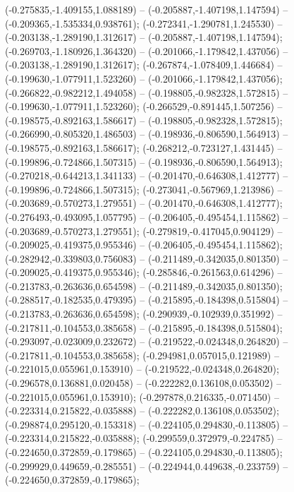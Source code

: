  (-0.275835,-1.409155,1.088189) -- (-0.205887,-1.407198,1.147594) -- (-0.209365,-1.535334,0.938761);
 (-0.272341,-1.290781,1.245530) -- (-0.203138,-1.289190,1.312617) -- (-0.205887,-1.407198,1.147594);
 (-0.269703,-1.180926,1.364320) -- (-0.201066,-1.179842,1.437056) -- (-0.203138,-1.289190,1.312617);
 (-0.267874,-1.078409,1.446684) -- (-0.199630,-1.077911,1.523260) -- (-0.201066,-1.179842,1.437056);
 (-0.266822,-0.982212,1.494058) -- (-0.198805,-0.982328,1.572815) -- (-0.199630,-1.077911,1.523260);
 (-0.266529,-0.891445,1.507256) -- (-0.198575,-0.892163,1.586617) -- (-0.198805,-0.982328,1.572815);
 (-0.266990,-0.805320,1.486503) -- (-0.198936,-0.806590,1.564913) -- (-0.198575,-0.892163,1.586617);
 (-0.268212,-0.723127,1.431445) -- (-0.199896,-0.724866,1.507315) -- (-0.198936,-0.806590,1.564913);
 (-0.270218,-0.644213,1.341133) -- (-0.201470,-0.646308,1.412777) -- (-0.199896,-0.724866,1.507315);
 (-0.273041,-0.567969,1.213986) -- (-0.203689,-0.570273,1.279551) -- (-0.201470,-0.646308,1.412777);
 (-0.276493,-0.493095,1.057795) -- (-0.206405,-0.495454,1.115862) -- (-0.203689,-0.570273,1.279551);
 (-0.279819,-0.417045,0.904129) -- (-0.209025,-0.419375,0.955346) -- (-0.206405,-0.495454,1.115862);
 (-0.282942,-0.339803,0.756083) -- (-0.211489,-0.342035,0.801350) -- (-0.209025,-0.419375,0.955346);
 (-0.285846,-0.261563,0.614296) -- (-0.213783,-0.263636,0.654598) -- (-0.211489,-0.342035,0.801350);
 (-0.288517,-0.182535,0.479395) -- (-0.215895,-0.184398,0.515804) -- (-0.213783,-0.263636,0.654598);
 (-0.290939,-0.102939,0.351992) -- (-0.217811,-0.104553,0.385658) -- (-0.215895,-0.184398,0.515804);
 (-0.293097,-0.023009,0.232672) -- (-0.219522,-0.024348,0.264820) -- (-0.217811,-0.104553,0.385658);
 (-0.294981,0.057015,0.121989) -- (-0.221015,0.055961,0.153910) -- (-0.219522,-0.024348,0.264820);
 (-0.296578,0.136881,0.020458) -- (-0.222282,0.136108,0.053502) -- (-0.221015,0.055961,0.153910);
 (-0.297878,0.216335,-0.071450) -- (-0.223314,0.215822,-0.035888) -- (-0.222282,0.136108,0.053502);
 (-0.298874,0.295120,-0.153318) -- (-0.224105,0.294830,-0.113805) -- (-0.223314,0.215822,-0.035888);
 (-0.299559,0.372979,-0.224785) -- (-0.224650,0.372859,-0.179865) -- (-0.224105,0.294830,-0.113805);
 (-0.299929,0.449659,-0.285551) -- (-0.224944,0.449638,-0.233759) -- (-0.224650,0.372859,-0.179865);

